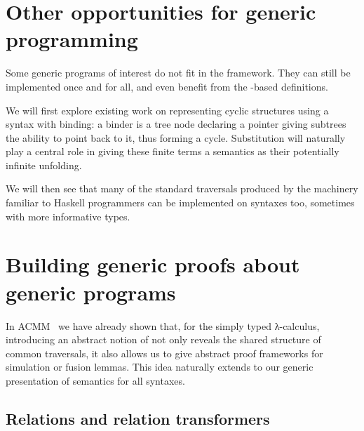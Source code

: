 








\section{Other opportunities for generic programming}

Some generic programs of interest do not fit in the 
framework. They can still be implemented once and for all, and even
benefit from the -based definitions.

We will first explore existing work on representing cyclic structures
using a syntax with binding: a binder is a tree node declaring a pointer
giving subtrees the ability to point back to it, thus forming a cycle.
Substitution will naturally play a central role in giving these finite
terms a semantics as their potentially infinite unfolding.

We will then see that many of the standard traversals produced by the
 machinery familiar to Haskell programmers can be implemented
on syntaxes too, sometimes with more informative types.





\section{Building generic proofs about generic programs}

In ACMM~\citeyear{allais2017type} we have
already shown that, for the simply typed λ-calculus, introducing an abstract
notion of  not only reveals the shared structure of common
traversals, it also allows us to give abstract proof frameworks for
simulation or fusion lemmas. This idea naturally extends to our generic
presentation of semantics for all syntaxes.


\subsection{Relations and relation transformers}


